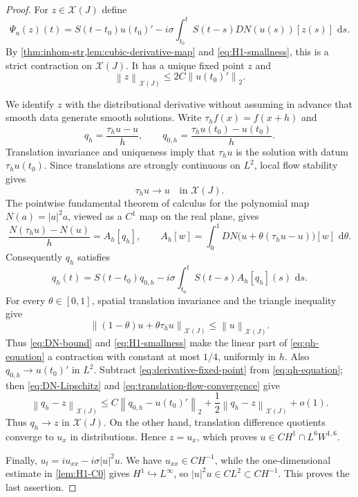 \documentclass[11pt,oneside]{book}
\theoremstyle{definition}
\theoremstyle{remark}
\newcommand{\1}{\mathbf 1}
\newcommand{\dd}{\,\mathrm d}
\newcommand{\norm}[1]{\left\lVert #1\right\rVert}
\begin{document}
\begin{proof}
For $z\in\mathcal X(J)$ define
\begin{equation}
 \Psi_u(z)(t)=S(t-t_0)u(t_0)'
 -i\sigma\int_{t_0}^tS(t-s)DN(u(s))[z(s)]\,\dd s.  \label{eq:derivative-fixed-point}
\end{equation}
By \cref{thm:inhom-str,lem:cubic-derivative-map} and
\eqref{eq:H1-smallness}, this is a strict contraction on
$\mathcal X(J)$.  It has a unique fixed point $z$ and
\[
 \norm z_{\mathcal X(J)}\le 2C\norm{u(t_0)'}_2.
\]

We identify $z$ with the distributional derivative without assuming in
advance that smooth data generate smooth solutions.  Write
$\tau_hf(x)=f(x+h)$ and
\[
 q_h=\frac{\tau_hu-u}{h},\qquad
 q_{0,h}=\frac{\tau_hu(t_0)-u(t_0)}h.
\]
Translation invariance and uniqueness imply that $\tau_hu$ is the solution
with datum $\tau_hu(t_0)$.  Since translations are strongly continuous on
$L^2$, local flow stability gives
\begin{equation}
 \tau_hu\longrightarrow u\quad\text{in }\mathcal X(J). \label{eq:translation-flow-convergence}
\end{equation}
The pointwise fundamental theorem of calculus for the polynomial map
$N(a)=|a|^2a$, viewed as a $C^1$ map on the real plane, gives
\[
 \frac{N(\tau_hu)-N(u)}h=A_h[q_h],
 \qquad
 A_h[w]=\int_0^1DN\bigl(u+\theta(\tau_hu-u)\bigr)[w]\,\dd\theta.
\]
Consequently $q_h$ satisfies
\begin{equation}
 q_h(t)=S(t-t_0)q_{0,h}
 -i\sigma\int_{t_0}^tS(t-s)A_h[q_h](s)\,\dd s.      \label{eq:qh-equation}
\end{equation}
For every $\theta\in[0,1]$, spatial translation invariance and the
triangle inequality give
\[
 \norm{(1-\theta)u+\theta\tau_hu}_{\mathcal X(J)}
 \le\norm u_{\mathcal X(J)}.
\]
Thus \eqref{eq:DN-bound} and \eqref{eq:H1-smallness} make the linear part of
\eqref{eq:qh-equation} a contraction with constant at most $1/4$, uniformly
in $h$.  Also $q_{0,h}\to u(t_0)'$ in $L^2$.  Subtract
\eqref{eq:derivative-fixed-point} from \eqref{eq:qh-equation}; then
\eqref{eq:DN-Lipschitz} and \eqref{eq:translation-flow-convergence} give
\[
 \norm{q_h-z}_{\mathcal X(J)}
 \le C\norm{q_{0,h}-u(t_0)'}_2
   +\frac12\norm{q_h-z}_{\mathcal X(J)}+o(1).
\]
Thus $q_h\to z$ in $\mathcal X(J)$.  On the other hand, translation
difference quotients converge to $u_x$ in distributions.  Hence $z=u_x$,
which proves $u\in C H^1\cap L^6W^{1,6}$.

Finally,
$u_t=i u_{xx}-i\sigma|u|^2u$.  We have $u_{xx}\in C H^{-1}$, while the
one-dimensional estimate in \cref{lem:H1-C0} gives
$H^1\hookrightarrow L^\infty$, so $|u|^2u\in C L^2\subset C H^{-1}$.
This proves the last assertion.
\end{proof}
\end{document}
